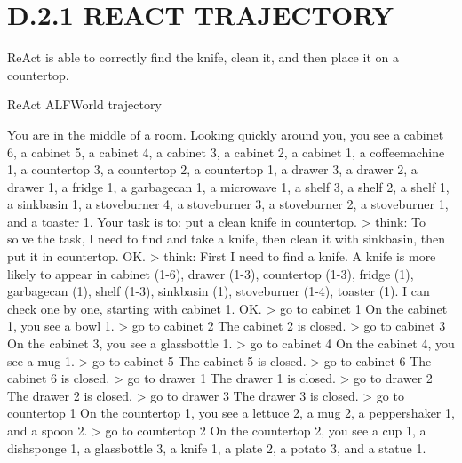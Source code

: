 \documentclass[
]{article}
\newenvironment{Shaded}{}{}
\newcommand{\NormalTok}[1]{#1}
\begin{document}
\section{D.2.1 REACT TRAJECTORY}\label{d.2.1-react-trajectory}

ReAct is able to correctly find the knife, clean it, and then place it
on a countertop.

ReAct ALFWorld trajectory

\begin{Shaded}
\begin{Highlighting}[]
\NormalTok{You are in the middle of a room. Looking quickly around you, you see a cabinet 6, a cabinet 5, a cabinet 4, a cabinet 3, a cabinet 2, a cabinet 1, a coffeemachine 1, a countertop 3, a countertop 2, a countertop 1, a drawer 3, a drawer 2, a drawer 1, a fridge 1, a garbagecan 1, a microwave 1, a shelf 3, a shelf 2, a shelf 1, a sinkbasin 1, a stoveburner 4, a stoveburner 3, a stoveburner 2, a stoveburner 1, and a toaster 1.}
\NormalTok{Your task is to: put a clean knife in countertop.}
\NormalTok{\textgreater{} think: To solve the task, I need to find and take a knife, then clean it with sinkbasin, then put it in countertop.}
\NormalTok{OK.}
\NormalTok{\textgreater{} think: First I need to find a knife. A knife is more likely to appear in cabinet (1{-}6), drawer (1{-}3), countertop (1{-}3), fridge (1), garbagecan (1), shelf (1{-}3), sinkbasin (1), stoveburner (1{-}4), toaster (1). I can check one by one, starting with cabinet 1.}
\NormalTok{OK.}
\NormalTok{\textgreater{} go to cabinet 1}
\NormalTok{On the cabinet 1, you see a bowl 1.}
\NormalTok{\textgreater{} go to cabinet 2}
\NormalTok{The cabinet 2 is closed.}
\NormalTok{\textgreater{} go to cabinet 3}
\NormalTok{On the cabinet 3, you see a glassbottle 1.}
\NormalTok{\textgreater{} go to cabinet 4}
\NormalTok{On the cabinet 4, you see a mug 1.}
\NormalTok{\textgreater{} go to cabinet 5}
\NormalTok{The cabinet 5 is closed.}
\NormalTok{\textgreater{} go to cabinet 6}
\NormalTok{The cabinet 6 is closed.}
\NormalTok{\textgreater{} go to drawer 1}
\NormalTok{The drawer 1 is closed.}
\NormalTok{\textgreater{} go to drawer 2}
\NormalTok{The drawer 2 is closed.}
\NormalTok{\textgreater{} go to drawer 3}
\NormalTok{The drawer 3 is closed.}
\NormalTok{\textgreater{} go to countertop 1}
\NormalTok{On the countertop 1, you see a lettuce 2, a mug 2, a peppershaker 1, and a spoon 2.}
\NormalTok{\textgreater{} go to countertop 2}
\NormalTok{On the countertop 2, you see a cup 1, a dishsponge 1, a glassbottle 3, a knife 1, a plate 2, a potato 3, and a statue 1.}

\end{Highlighting}
\end{Shaded}
\end{document}
